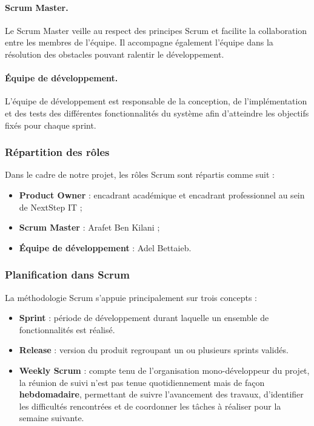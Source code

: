 \paragraph{Scrum Master.} Le Scrum Master veille au respect des principes Scrum et facilite la collaboration entre les membres de l'équipe. Il accompagne également l'équipe dans la résolution des obstacles pouvant ralentir le développement.

\paragraph{Équipe de développement.} L'équipe de développement est responsable de la conception, de l'implémentation et des tests des différentes fonctionnalités du système afin d'atteindre les objectifs fixés pour chaque sprint.

\subsubsection{Répartition des rôles}

Dans le cadre de notre projet, les rôles Scrum sont répartis comme suit :
\begin{itemize}
    \item \textbf{Product Owner} : encadrant académique et encadrant professionnel au sein de NextStep IT ;
    \item \textbf{Scrum Master} : Arafet Ben Kilani ;
    \item \textbf{Équipe de développement} : Adel Bettaieb.
\end{itemize}

\subsubsection{Planification dans Scrum}

La méthodologie Scrum s'appuie principalement sur trois concepts :
\begin{itemize}
    \item \textbf{Sprint} : période de développement durant laquelle un ensemble de fonctionnalités est réalisé.
    \item \textbf{Release} : version du produit regroupant un ou plusieurs sprints validés.
    \item \textbf{Weekly Scrum} : compte tenu de l'organisation mono-développeur du projet, la réunion de suivi n'est pas tenue quotidiennement mais de façon \textbf{hebdomadaire}, permettant de suivre l'avancement des travaux, d'identifier les difficultés rencontrées et de coordonner les tâches à réaliser pour la semaine suivante.
\end{itemize}


